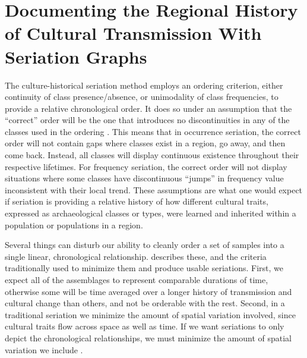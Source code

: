     \section{Documenting the Regional History of Cultural Transmission With Seriation Graphs}\label{metapop:sec:seriation-graphs}
    
    The culture-historical seriation method employs an ordering criterion, either continuity of class presence/absence, or unimodality of class frequencies, to provide a relative chronological order.  It does so under an assumption that the ``correct'' order will be the one that introduces no discontinuities in any of the classes used in the ordering \citep{Ford1949,PFG1951,Rouse1939}.  This means that in occurrence seriation, the correct order will not contain gaps where classes exist in a region, go away, and then come back.  Instead, all classes will display continuous existence throughout their respective lifetimes.  For frequency seriation, the correct order will not display situations where some classes have discontinuous ``jumps'' in frequency value inconsistent with their local trend.  These assumptions are what one would expect if seriation is providing a relative history of how different cultural traits, expressed as archaeological classes or types, were learned and inherited within a population or populations in a region.
    
    Several things can disturb our ability to cleanly order a set of samples into a single linear, chronological relationship.  \citet{Dunnell1970} describes these, and the criteria traditionally used to minimize them and produce usable seriations.  First, we expect all of the assemblages to represent comparable durations of time, otherwise some will be time averaged over a longer history of transmission and cultural change than others, and not be orderable with the rest.  Second, in a traditional seriation we minimize the amount of spatial variation involved, since cultural traits flow across space as well as time.  If we want seriations to only depict the chronological relationships, we must minimize the amount of spatial variation we include \citep{PFG1951,Rouse1967}.
    
